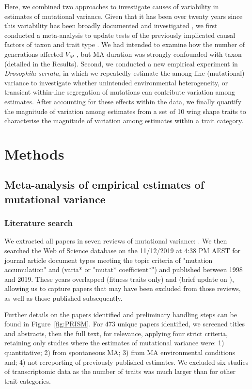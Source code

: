 Here, we combined two approaches to investigate causes of variability in estimates of mutational variance. Given that it has been over twenty years since this variability has been broadly documented and investigated \citep{Houl96, Houl98,Lync99}, we first conducted a meta-analysis to update tests of the previously implicated causal factors of taxon \citep{Lync98, Lync99, Hall09} and trait type \citep{Houl96, Houl98}. We had intended to examine how the number of generations affected $V_M$ \citep{Lync86,Mack95}, but MA duration was strongly confounded with taxon (detailed in the Results). Second, we conducted a new empirical experiment in \textit{Drosophila serrata}, in which we repeatedly estimate the among-line (mutational) variance to investigate whether unintended environmental heterogeneity, or transient within-line segregation of mutations can contribute variation among estimates. After accounting for these effects within the data, we finally quantify the magnitude of variation among estimates from a set of 10 wing shape traits to characterise the magnitude of variation among estimates within a trait category.\par

\section{Methods} 
\subsection{Meta-analysis of empirical estimates of mutational variance} 
\subsubsection{Literature search} 
We extracted all papers in seven reviews of mutational variance: \citet{Lync88b,Keig93,Houl96,Lync98c12,Lync99,Hall09, Wals18c12}. We then searched the Web of Science database on the 11/12/2019 at 4:38 PM AEST for journal article document types meeting the topic criteria of "mutation accumulation" and (varia* or "mutat* coefficient*") and published between 1998 and 2019. These years overlapped \citet{Hall09} (fitness traits only) and \citet{Wals18c12} (brief update on \citealp{Lync98c12}), allowing us to capture papers that may have been excluded from those reviews, as well as those published subsequently. \par
Further details on the papers identified and preliminary handling steps can be found in Figure~\ref{fig:PRISM}. For 473 unique papers identified, we screened titles and abstracts, then the full text, for relevance, applying four strict criteria, retaining only studies where the estimates of mutational variance were: 1) quantitative; 2) from spontaneous MA; 3) from MA environmental conditions and; 4) not rereporting of previously published estimates. We excluded six studies of transcriptomic data as the number of traits was much larger than for other trait categories.\par

